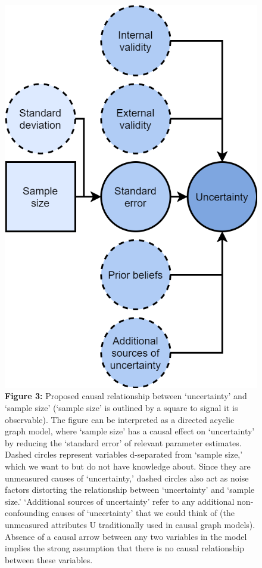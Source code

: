 \documentclass[
  english,
  jou,floatsintext]{apa6}
\begin{document}
\begin{figure}
\centering
\includegraphics{figure_3.png}
\caption{\textbf{Figure 3:} Proposed causal relationship between `uncertainty' and `sample size' (`sample size' is outlined by a square to signal it is observable). The figure can be interpreted as a directed acyclic graph model, where `sample size' has a causal effect on `uncertainty' by reducing the `standard error' of relevant parameter estimates. Dashed circles represent variables d-separated from `sample size,' which we want to but do not have knowledge about. Since they are unmeasured causes of `uncertainty,' dashed circles also act as noise factors distorting the relationship between `uncertainty' and `sample size.' `Additional sources of uncertainty' refer to any additional non-confounding causes of `uncertainty' that we could think of (the unmeasured attributes U traditionally used in causal graph models). Absence of a causal arrow between any two variables in the model implies the strong assumption that there is no causal relationship between these variables. \label{fig:3}}
\end{figure}
\end{document}
